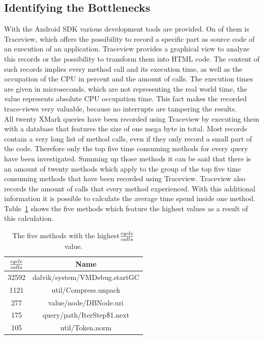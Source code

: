 \subsection{Identifying the Bottlenecks}
\label{sec:identifying-the-bottlenecks}
With the Android SDK various development tools are provided.
On of them is Traceview, which offers the possibility to record a specific part as source code of an execution of an application.
Traceview provides a graphical view to analyze this records or the possibility to transform them into HTML code.
The content of such records implies every method call and its execution time, as well as the occupation of the CPU in percent and the amount of calls.
The execution times are given in microseconds, which are not representing the real world time, the value represents absolute CPU occupation time.
This fact makes the recorded trace-views very valuable, because no interrupts are tampering the results.\\
All twenty XMark queries have been recorded using Traceview by executing them with a database that features the size of one mega byte in total.
Most records contain a very long list of method calls, even if they only record a small part of the code.
Therefore only the top five time consuming methods for every query have been investigated.
Summing up those methods it can be said that there is an amount of twenty methods which apply to the group of the top five time consuming methods that have been recorded using Traceview.
Traceview also records the amount of calls that every method experienced.
With this additional information it is possible to calculate the average time spend inside one method.
Table~\ref{tab:tob-five-cycle-call} shows the five methods which feature the highest values as a result of this calculation.
\begin{table}[htpb]
	\centering
	\begin{tabular}{|c|c|}
		\hline
		${cycle \over calls}$&Name\\[0.9ex]
		\hline
		32592&dalvik/system/VMDebug.startGC\\
		\hline
		1121&util/Compress.unpack\\
		\hline
		277&value/node/DBNode.uri\\
		\hline
		175&query/path/IterStep\$1.next\\
		\hline
		105&util/Token.norm\\
		\hline
	\end{tabular}
	\caption{The five methods with the highest${cycle \over calls}$ value.}
	\label{tab:tob-five-cycle-call}
\end{table}

